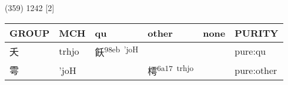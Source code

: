 \documentclass[14pt,a4paper]{scrartcl}
\begin{document}
(359) 1242 {[}2{]}

\begin{longtable}[c]{@{}llllll@{}}
\toprule
\begin{minipage}[b]{0.14\columnwidth}\raggedright\strut
GROUP
\strut\end{minipage} &
\begin{minipage}[b]{0.14\columnwidth}\raggedright\strut
MCH
\strut\end{minipage} &
\begin{minipage}[b]{0.14\columnwidth}\raggedright\strut
qu
\strut\end{minipage} &
\begin{minipage}[b]{0.14\columnwidth}\raggedright\strut
other
\strut\end{minipage} &
\begin{minipage}[b]{0.14\columnwidth}\raggedright\strut
none
\strut\end{minipage} &
\begin{minipage}[b]{0.14\columnwidth}\raggedright\strut
PURITY
\strut\end{minipage}\tabularnewline
\midrule
\endhead
\begin{minipage}[t]{0.14\columnwidth}\raggedright\strut
夭
\strut\end{minipage} &
\begin{minipage}[t]{0.14\columnwidth}\raggedright\strut
trhjo
\strut\end{minipage} &
\begin{minipage}[t]{0.14\columnwidth}\raggedright\strut
飫\textsuperscript{98eb~'joH}
\strut\end{minipage} &
\begin{minipage}[t]{0.14\columnwidth}\raggedright\strut
\strut\end{minipage} &
\begin{minipage}[t]{0.14\columnwidth}\raggedright\strut
\strut\end{minipage} &
\begin{minipage}[t]{0.14\columnwidth}\raggedright\strut
pure:qu
\strut\end{minipage}\tabularnewline
\begin{minipage}[t]{0.14\columnwidth}\raggedright\strut
雩
\strut\end{minipage} &
\begin{minipage}[t]{0.14\columnwidth}\raggedright\strut
'joH
\strut\end{minipage} &
\begin{minipage}[t]{0.14\columnwidth}\raggedright\strut
\strut\end{minipage} &
\begin{minipage}[t]{0.14\columnwidth}\raggedright\strut
樗\textsuperscript{6a17~trhjo}
\strut\end{minipage} &
\begin{minipage}[t]{0.14\columnwidth}\raggedright\strut
\strut\end{minipage} &
\begin{minipage}[t]{0.14\columnwidth}\raggedright\strut
pure:other
\strut\end{minipage}\tabularnewline
\bottomrule
\end{longtable}
\end{document}
